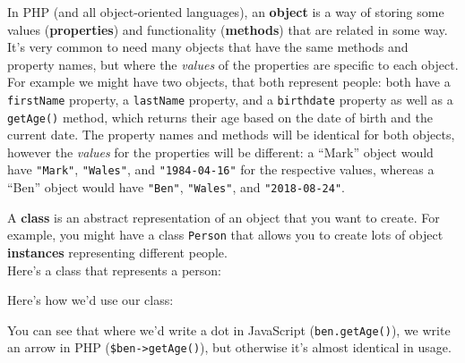 In PHP (and all object-oriented languages), an \textbf{object} is a way of storing some values (\textbf{properties}) and functionality (\textbf{methods}) that are related in some way.
\\

It's very common to need many objects that have the same methods and property names, but where the \textit{values} of the properties are specific to each object.
\\

For example we might have two objects, that both represent people: both have a \texttt{firstName} property, a \texttt{lastName} property, and a \texttt{birthdate} property as well as a \texttt{getAge()} method, which returns their age based on the date of birth and the current date. The property names and methods will be identical for both objects, however the \textit{values} for the properties will be different: a ``Mark'' object would have \texttt{"Mark"}, \texttt{"Wales"}, and \texttt{"1984-04-16"} for the respective values, whereas a ``Ben'' object would have \texttt{"Ben"}, \texttt{"Wales"}, and \texttt{"2018-08-24"}.
\\


\pagebreak

A \textbf{class} is an abstract representation of an object that you want to create. For example, you might have a class \texttt{Person} that allows you to create lots of object \textbf{instances} representing different people.
\\

Here's a class that represents a person:


Here's how we'd use our class:


You can see that where we'd write a dot in JavaScript (\texttt{ben.getAge()}), we write an arrow in PHP (\texttt{\$ben->getAge()}), but otherwise it's almost identical in usage.

